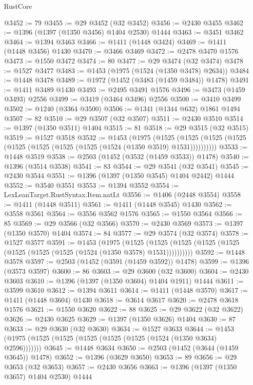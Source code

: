 \begin{lexlean}{RustCore}
\begin{coremodule}
@3452 := 79
@3455 := @29 @3452 (@32 @3452)
@3456 := @2430 @3455
@3462 := @1396 (@1397 (@1350 @3456) @1404 @2530) @1444
@3463 := @3451 @3462
@3464 := @1394 @3463
@3466 := @1411 (@1448 @3424)
@3469 := @1411 (@1448 @3456) @1430
@3470 := @3466 @3469
@3472 := @2478 @3470 @1576
@3473 := @1550 @3472
@3474 := 80
@3477 := @29 @3474 (@32 @3474)
@3478 := @1527 @3477
@3483 := @1453 (@1975 (@1524 (@1350 @3478) @2634))
@3484 := @1448 @3478
@3489 := @1972 (@1452 (@3483 (@1459 @3484)) @1478)
@3491 := @1411 @3489 @1430
@3493 := @2495 @3491 @1576
@3496 := @3473 (@1459 @3493) @2556
@3499 := @3419 (@3464 @3496) @2556
@3500 := @3410 @3499
@3502 := @1240 (@3364 @3500)
@3506 := @1341 (@1344 @632) @1861 @1494
@3507 := 82
@3510 := @29 @3507 (@32 @3507)
@3511 := @2430 @3510
@3514 := @1397 (@1350 @3511) @1404
@3515 := 81
@3518 := @29 @3515 (@32 @3515)
@3519 := @1527 @3518
@3532 := @1453
    (@1975
      (@1525 (@1525 (@1525 (@1525 (@1525 (@1525 (@1525 (@1525 (@1524 (@1350 @3519) @1531))))))))))
@3533 := @1448 @3519
@3538 := @2503 (@1452 (@3532 (@1459 @3533)) @1478)
@3540 := @1396 (@3514 @3538)
@3541 := 83
@3544 := @29 @3541 (@32 @3541)
@3545 := @2430 @3544
@3551 := @1396 (@1397 (@1350 @3545) @1404 @2442) @1444
@3552 := @3540 @3551
@3553 := @1394 @3552
@3554 := LexLeanTarget.RustSyntax.Item.natLt
@3556 := @1406 (@2448 @3554)
@3558 := @1411 (@1448 @3511)
@3561 := @1411 (@1448 @3545) @1430
@3562 := @3558 @3561
@3564 := @3556 @3562 @1576
@3565 := @1550 @3564
@3566 := 85
@3569 := @29 @3566 (@32 @3566)
@3570 := @2430 @3569
@3573 := @1397 (@1350 @3570) @1404
@3574 := 84
@3577 := @29 @3574 (@32 @3574)
@3578 := @1527 @3577
@3591 := @1453
    (@1975
      (@1525 (@1525 (@1525 (@1525 (@1525 (@1525 (@1525 (@1525 (@1524 (@1350 @3578) @1531))))))))))
@3592 := @1448 @3578
@3597 := @2503 (@1452 (@3591 (@1459 @3592)) @1478)
@3599 := @1396 (@3573 @3597)
@3600 := 86
@3603 := @29 @3600 (@32 @3600)
@3604 := @2430 @3603
@3610 := @1396 (@1397 (@1350 @3604) @1404 @1911) @1444
@3611 := @3599 @3610
@3612 := @1394 @3611
@3614 := @1411 (@1448 @3570)
@3617 := @1411 (@1448 @3604) @1430
@3618 := @3614 @3617
@3620 := @2478 @3618 @1576
@3621 := @1550 @3620
@3622 := 88
@3625 := @29 @3622 (@32 @3622)
@3626 := @2430 @3625
@3629 := @1397 (@1350 @3626) @1404
@3630 := 87
@3633 := @29 @3630 (@32 @3630)
@3634 := @1527 @3633
@3644 := @1453 (@1975 (@1525 (@1525 (@1525 (@1525 (@1525 (@1524 (@1350 @3634) @2596)))))))
@3645 := @1448 @3634
@3650 := @2503 (@1452 (@3644 (@1459 @3645)) @1478)
@3652 := @1396 (@3629 @3650)
@3653 := 89
@3656 := @29 @3653 (@32 @3653)
@3657 := @2430 @3656
@3663 := @1396 (@1397 (@1350 @3657) @1404 @2530) @1444

\end{coremodule}
\end{lexlean}
